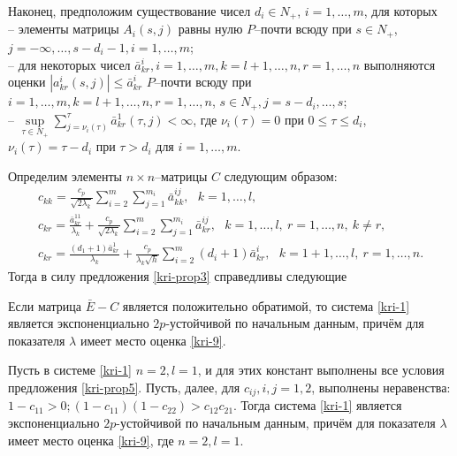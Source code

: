 Наконец, предположим существование чисел $d_i \in N_+$, $i =
1,\dots,m$, для которых\\
\noindent
 -- элементы матрицы $A_i(s,j)$ равны нулю
$P$--почти всюду при $s \in N_+$, $j=-\infty,\dots,s-d_i-1,
i=1,\dots,m$;\\
-- для некоторых чисел $\bar a^i_{kr},i=1,\dots,m, k = l+1, \dots, n, r =
1,\dots,n$ выполняются оценки $|a^i_{kr}(s,j)| \leq \bar a^i_{kr}$
$P$--почти всюду при $i=1,\dots,m, k = l+1, \dots, n, r = 1,\dots,n$, $s
\in N_+, j = s - d_i, \dots, s$;\\
-- $\mathrel {\mathop {\sup} \limits _{\tau \in N_+}}\sum
\limits _{j=\nu _i (\tau)}^{\tau}\bar a^{1}_{kr}(\tau,j) < \infty $,
где $\nu _i (\tau) = 0$ при $0 \le \tau \le d_i$, $\nu _i (\tau) =
\tau - d_i$ при $\tau > d_i$ для $i= 1,\dots,m$.

        Определим элементы
$n\times n$--матрицы $C$ следующим образом:
$$
\begin{array}{crl}
c_{kk}  = \frac{c_p}{\sqrt{2\lambda_k }}\sum
\limits_{i=2}^m \sum \limits_{j=1}^{m_i}\bar a^{ij}_{kk}, \ \ \ k = 1,\dots,l,\\
c_{kr} = \frac{\bar a^{11}_{kr}}{\lambda _k }+
\frac{c_p}{\sqrt{2\lambda_k }}\sum \limits_{i=2}^m \sum
\limits_{j=1}^{m_i}\bar a^{ij}_{kr}, \ \ \ k =
1,\dots,l, \ r = 1, \dots, n, \ k \neq r,\\
c_{kr} = \frac{(d_1+1)\bar a^{1}_{kr}}{\lambda_k} +
\frac{c_p}{\lambda_k\sqrt{h}} \sum \limits _{i=2}^{m}\mathrel (d_i +
1)\bar a^{i}_{kr}, \ \ \ k = 1 + 1,\dots,l,\ r = 1,\dots,n.
\end{array}
$$
Тогда в силу предложения \ref{kri-prop3} справедливы следующие

\begin{proposition}\label{kri-prop5}  Если матрица $\bar E - C$ является
положительно обратимой, то система \eqref{kri-1} является экспоненциально
${2p}$-устойчивой по начальным данным, причём для показателя
$\lambda$ имеет место оценка \eqref{kri-9}.
\end{proposition}

\begin{proposition}\label{kri-prop6} Пусть в системе \eqref{kri-1} $n = 2, l =1$, и
для этих констант выполнены все условия предложения \ref{kri-prop5}. Пусть, далее,
для $c_{ij}, i,j = 1, 2$, выполнены неравенства: $ 1 - c_{11}
> 0; (1 - c_{11})(1 - c_{22}) > c_{12}c_{21}$. Тогда система \eqref{kri-1}
является экспоненциально ${2p}$-устойчивой по начальным данным,
причём для показателя  $\lambda$ имеет место оценка \eqref{kri-9}, где $n = 2,
l =1$.
\end{proposition}

